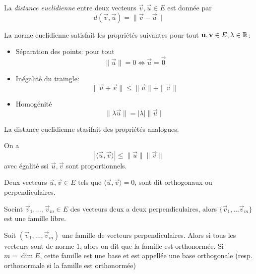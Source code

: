 \begin{definition}
	La \emph{distance euclidienne} entre deux vecteurs $\vec{v}, \vec{u} \in E$
	est donnée par
	\begin{equation*}
		d(\vec{v}, \vec{u}) = \|\vec{v}-\vec{u}\|
	\end{equation*}
\end{definition}

\begin{theorem}
	La norme euclidienne satisfait les propriétés suivantes
	pour tout $\mathbf{u}, \mathbf{v} \in E, \lambda \in \mathbb{R}$:
	\begin{itemize}
		\item Séparation des points: pour tout
			\begin{equation*}
				\|\vec{u}\| = 0 \iff \vec{u} = \vec{0}
			\end{equation*}
		\item Inégalité du traingle:
			\begin{equation*}
				\|\vec{u} + \vec{v}\| \leq \|\vec{u}\| + \|\vec{v}\|
			\end{equation*}
		\item Homogénité
			\begin{equation*}
				\|\lambda\vec{u}\| = |\lambda|\|\vec{u}\|
			\end{equation*}
	\end{itemize}
	La distance euclidienne stasifait des propriétés analogues.
\end{theorem}

\begin{proposition}
	On a 
	\begin{equation*}
		|\langle \vec{u}, \vec{v}\rangle| \leq \|\vec{u}\|\|\vec{v}\|
	\end{equation*}
	avec égalité ssi $\vec{u}, \vec{v}$ sont proportionnels.
\end{proposition}

\begin{definition}
	Deux vecteurs $\vec{u}, \vec{v} \in E$ tels que $\langle \vec{u}, \vec{v}
	\rangle = 0$, sont dit orthogonaux ou perpendiculaires.
\end{definition}

\begin{proposition}
	Soeint $\vec{v}_1, \dots, \vec{v}_m \in E$ des vecteurs deux a deux
	perpendiculaires, alors $\{\vec{v}_1, \dots \vec{v}_m\}$ est une famille
	libre.
\end{proposition}

\begin{definition}
	Soit $(\vec{v}_1, \dots, \vec{v}_m)$ une famille de vecteurs
	perpendiculaires. Alors si tous les vecteurs sont de norme $1$, alors on dit
	que la famille est orthonormée. Si $m = \dim E$, cette famille est une base
	et est appellée une base orthogonale (resp. orthonormale si la famille est
	orthonormée)
\end{definition}

